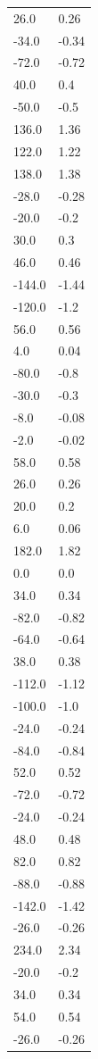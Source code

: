 \begin{longtable}{ll}
26.0 & 0.26 \\
-34.0 & -0.34 \\
-72.0 & -0.72 \\
40.0 & 0.4 \\
-50.0 & -0.5 \\
136.0 & 1.36 \\
122.0 & 1.22 \\
138.0 & 1.38 \\
-28.0 & -0.28 \\
-20.0 & -0.2 \\
30.0 & 0.3 \\
46.0 & 0.46 \\
-144.0 & -1.44 \\
-120.0 & -1.2 \\
56.0 & 0.56 \\
4.0 & 0.04 \\
-80.0 & -0.8 \\
-30.0 & -0.3 \\
-8.0 & -0.08 \\
-2.0 & -0.02 \\
58.0 & 0.58 \\
26.0 & 0.26 \\
20.0 & 0.2 \\
6.0 & 0.06 \\
182.0 & 1.82 \\
0.0 & 0.0 \\
34.0 & 0.34 \\
-82.0 & -0.82 \\
-64.0 & -0.64 \\
38.0 & 0.38 \\
-112.0 & -1.12 \\
-100.0 & -1.0 \\
-24.0 & -0.24 \\
-84.0 & -0.84 \\
52.0 & 0.52 \\
-72.0 & -0.72 \\
-24.0 & -0.24 \\
48.0 & 0.48 \\
82.0 & 0.82 \\
-88.0 & -0.88 \\
-142.0 & -1.42 \\
-26.0 & -0.26 \\
234.0 & 2.34 \\
-20.0 & -0.2 \\
34.0 & 0.34 \\
54.0 & 0.54 \\
-26.0 & -0.26 \\

\end{longtable}
